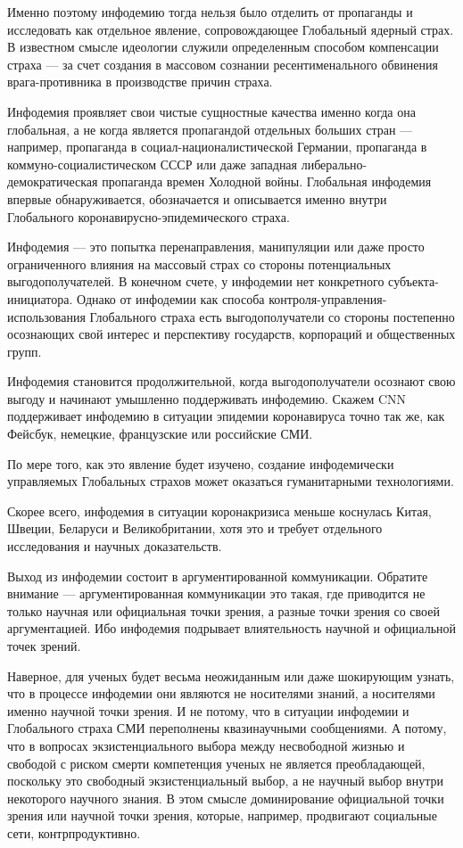 Именно поэтому инфодемию тогда нельзя было отделить от пропаганды и исследовать
как отдельное явление, сопровождающее Глобальный ядерный страх. В известном
смысле идеологии служили определенным способом компенсации страха — за счет
создания в массовом сознании ресентименального обвинения врага-противника в
производстве причин страха.

Инфодемия проявляет свои чистые сущностные качества именно когда она
глобальная, а не когда является пропагандой отдельных больших стран — например,
пропаганда в социал-националистической Германии, пропаганда в
коммуно-социалистическом СССР или даже западная либерально-демократическая
пропаганда времен Холодной войны. Глобальная инфодемия впервые обнаруживается,
обозначается и описывается именно внутри Глобального
коронавирусно-эпидемического страха.

Инфодемия — это попытка перенаправления, манипуляции или даже просто
ограниченного влияния на массовый страх со стороны потенциальных
выгодополучателей. В конечном счете, у инфодемии нет конкретного
субъекта-инициатора. Однако от инфодемии как способа
контроля-управления-использования Глобального страха есть выгодополучатели со
стороны постепенно осознающих свой интерес и перспективу государств, корпораций
и общественных групп.

Инфодемия становится продолжительной, когда выгодополучатели осознают свою
выгоду и начинают умышленно поддерживать инфодемию. Скажем CNN поддерживает
инфодемию в ситуации эпидемии коронавируса точно так же, как Фейсбук, немецкие,
французские или российские СМИ.

По мере того, как это явление будет изучено, создание инфодемически управляемых
Глобальных страхов может оказаться гуманитарными технологиями.

Скорее всего, инфодемия в ситуации коронакризиса меньше коснулась Китая,
Швеции, Беларуси и Великобритании, хотя это и требует отдельного исследования и
научных доказательств.

Выход из инфодемии состоит в аргументированной коммуникации. Обратите внимание
— аргументированная коммуникации это такая, где приводится не только научная
или официальная точки зрения, а разные точки зрения со своей аргументацией. Ибо
инфодемия подрывает влиятельность научной и официальной точек зрений.

Наверное, для ученых будет весьма неожиданным или даже шокирующим узнать, что в
процессе инфодемии они являются не носителями знаний, а носителями именно
научной точки зрения. И не потому, что в ситуации инфодемии и Глобального
страха СМИ переполнены квазинаучными сообщениями. А потому, что в вопросах
экзистенциального выбора между несвободной жизнью и свободой с риском смерти
компетенция ученых не является преобладающей, поскольку это свободный
экзистенциальный выбор, а не научный выбор внутри некоторого научного знания. В
этом смысле доминирование официальной точки зрения или научной точки зрения,
которые, например, продвигают социальные сети, контрпродуктивно.

